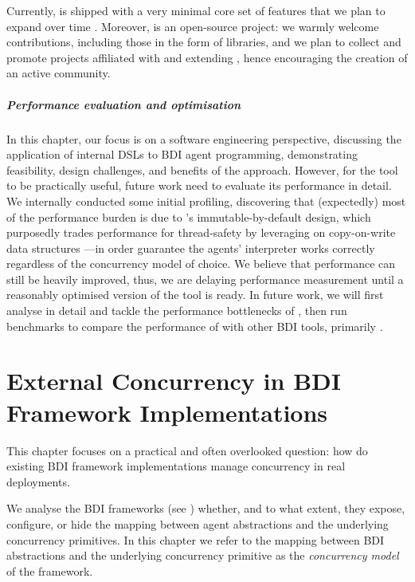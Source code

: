 Currently,
\jakta{} is shipped with a very minimal core set of features that we plan to expand over time .
%
Moreover,
\jakta{} is an open-source project:
we warmly welcome contributions,
including those in the form of libraries,
and we plan to collect and promote projects affiliated with and extending \jakta{},
hence encouraging the creation of an active community.

\paragraph{Performance evaluation and optimisation}
In this chapter, our focus is on a software engineering perspective,
discussing the application of internal \acp{DSL} to \ac{BDI} agent programming,
demonstrating feasibility, design challenges, and benefits of the approach.
%
However, for the tool to be practically useful,
future work need to evaluate its performance in detail.
%
We internally conducted some initial profiling,
discovering that (expectedly) most of the performance burden is due to \jakta{}'s immutable-by-default design,
which purposedly trades performance for thread-safety by leveraging on copy-on-write data structures%
---in order guarantee the agents' interpreter works correctly regardless of the concurrency model of choice.
%
We believe that performance can still be heavily improved,
thus, we are delaying performance measurement until a reasonably optimised version of the tool is ready.
%
In future work,
we will first analyse in detail and tackle the performance bottlenecks of \jakta{},
then run benchmarks to compare the performance of \jakta{} with other \ac{BDI} tools,
primarily \jason{}.

\chapter{External Concurrency in BDI Framework Implementations}
\label{chap:concurrency}

This chapter focuses on a practical and often overlooked question: 
how do existing \ac{BDI} framework implementations 
manage concurrency in real deployments. 

We analyse the \ac{BDI} frameworks (see ) whether, 
and to what extent, they 
expose, 
configure, 
or hide the mapping between agent abstractions 
and the underlying concurrency primitives.
%
In this chapter we refer to the mapping between \ac{BDI} abstractions 
and the underlying concurrency primitive
as the \emph{concurrency model} of the framework.

